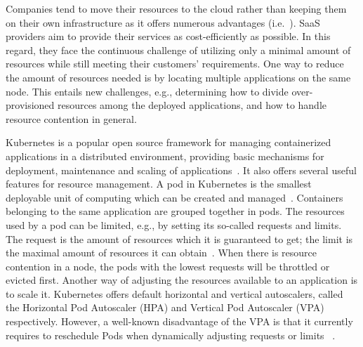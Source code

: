 Companies tend to move their resources to the cloud rather than keeping them on their own infrastructure as it offers numerous advantages (i.e.~\citep{AhmadiM.2018Caao}). SaaS providers aim to provide their services as cost-efficiently as possible. In this regard, they face the continuous challenge of utilizing only a minimal amount of resources while still meeting their customers' requirements. One way to reduce the amount of resources needed is by locating multiple applications on the same node. This entails new challenges, e.g., determining how to divide over-provisioned resources among the deployed applications, and how to handle resource contention in general. 

Kubernetes is a popular open source framework for managing containerized applications in a distributed environment, providing basic mechanisms for deployment, maintenance and scaling of applications~\citep{kubernetes_github}. It also offers several useful features for resource management. 
A pod in Kubernetes is the smallest deployable unit of computing which can be created and managed~\citep{pod}. Containers belonging to the same application are grouped together in pods. 
The resources used by a pod can be limited, e.g., by setting its so-called requests and limits. The request is the amount of resources which it is guaranteed to get; the limit is the maximal amount of resources it can obtain~\citep{requestlimit}. When there is resource contention in a node, the pods with the lowest requests will be throttled or evicted first. Another way of adjusting the resources available to an application is to scale it. Kubernetes offers default horizontal and vertical autoscalers, called the Horizontal Pod Autoscaler (HPA) and Vertical Pod Autoscaler (VPA) respectively. However, a well-known disadvantage of the VPA is that it currently requires to reschedule Pods when dynamically adjusting requests or limits ~\citep{in-place-pod-resources-updates}.%

